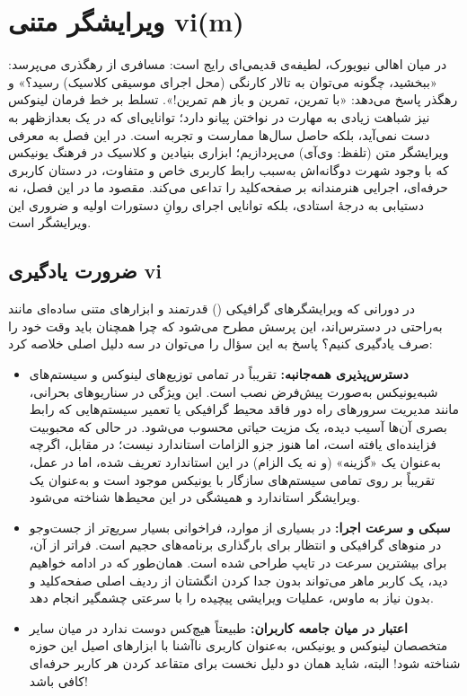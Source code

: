 \chapter{ویرایشگر متنی vi(m)}

در میان اهالی نیویورک، لطیفه‌ی قدیمی‌ای رایج است: مسافری از رهگذری می‌پرسد: «ببخشید، چگونه می‌توان به تالار کارنگی (محل اجرای موسیقی کلاسیک) رسید؟» و رهگذر پاسخ می‌دهد: «با تمرین، تمرین و باز هم تمرین!». تسلط بر خط فرمان لینوکس نیز شباهت زیادی به مهارت در نواختن پیانو دارد؛ توانایی‌ای که در یک بعدازظهر به دست نمی‌آید، بلکه حاصل سال‌ها ممارست و تجربه است. در این فصل به معرفی ویرایشگر متن  (تلفظ: وی‌آی) می‌پردازیم؛ ابزاری بنیادین و کلاسیک در فرهنگ یونیکس که با وجود شهرت دوگانه‌اش به‌سبب رابط کاربری خاص و متفاوت، در دستان کاربری حرفه‌ای، اجرایی هنرمندانه بر صفحه‌کلید را تداعی می‌کند. مقصود ما در این فصل، نه دستیابی به درجهٔ استادی، بلکه توانایی اجرای روانِ دستورات اولیه و ضروری این ویرایشگر است.

\section{ضرورت یادگیری vi}

در دورانی که ویرایشگرهای گرافیکی () قدرتمند و ابزارهای متنی ساده‌ای مانند  به‌راحتی در دسترس‌اند، این پرسش مطرح می‌شود که چرا همچنان باید وقت خود را صرف یادگیری  کنیم؟ پاسخ به این سؤال را می‌توان در سه دلیل اصلی خلاصه کرد:

\begin{itemize}
  \item \textbf{دسترس‌پذیری همه‌جانبه:}  تقریباً در تمامی توزیع‌های لینوکس و سیستم‌های شبه‌یونیکس به‌صورت پیش‌فرض نصب است. این ویژگی در سناریوهای بحرانی، مانند مدیریت سرورهای راه دور فاقد محیط گرافیکی یا تعمیر سیستم‌هایی که رابط بصری آن‌ها آسیب دیده، یک مزیت حیاتی محسوب می‌شود. در حالی که  محبوبیت فزاینده‌ای یافته است، اما هنوز جزو الزامات استاندارد  نیست؛ در مقابل، اگرچه  به‌عنوان یک «گزینه» (و نه یک الزام) در این استاندارد تعریف شده، اما در عمل، تقریباً بر روی تمامی سیستم‌های سازگار با یونیکس موجود است و به‌عنوان یک ویرایشگر استاندارد و همیشگی در این محیط‌ها شناخته می‌شود.

  \item \textbf{سبکی و سرعت اجرا:} در بسیاری از موارد، فراخوانی  بسیار سریع‌تر از جست‌وجو در منوهای گرافیکی و انتظار برای بارگذاری برنامه‌های حجیم است. فراتر از آن،  برای بیشترین سرعت در تایپ طراحی شده است. همان‌طور که در ادامه خواهیم دید، یک کاربر ماهر می‌تواند بدون جدا کردن انگشتان از ردیف اصلی صفحه‌کلید و بدون نیاز به ماوس، عملیات ویرایشی پیچیده را با سرعتی چشمگیر انجام دهد.

  \item \textbf{اعتبار در میان جامعه کاربران:} طبیعتاً هیچ‌کس دوست ندارد در میان سایر متخصصان لینوکس و یونیکس، به‌عنوان کاربری ناآشنا با ابزارهای اصیل این حوزه شناخته شود! البته، شاید همان دو دلیل نخست برای متقاعد کردن هر کاربر حرفه‌ای کافی باشد!
\end{itemize}

